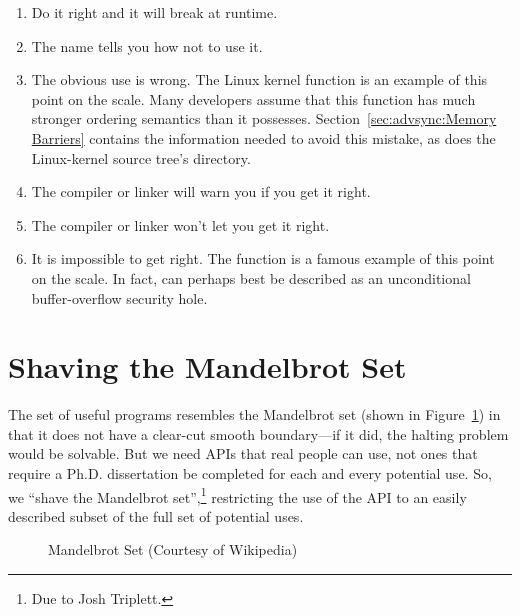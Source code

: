 \begin{enumerate}
\item	Do it right and it will break at runtime.
\item	The name tells you how not to use it.
\item	The obvious use is wrong.
	The Linux kernel  function is an example of
	this point on the scale.
	Many developers assume that this function has much
	stronger ordering semantics than it possesses.
	Section~\ref{sec:advsync:Memory Barriers} contains the
	information needed to avoid this mistake, as does the
	Linux-kernel source tree's  directory.
\item	The compiler or linker will warn you if you get it right.
\item	The compiler or linker won't let you get it right.
\item	It is impossible to get right.
	The  function is a famous example of this point on
	the scale.
	In fact,  can perhaps best be described as
	an unconditional buffer-overflow security hole.
\fi
\end{enumerate}

\section{Shaving the Mandelbrot Set}
\label{sec:easy:Shaving the Mandelbrot Set}

The set of useful programs resembles the Mandelbrot set
(shown in Figure~\ref{fig:easy:Mandelbrot Set})
in that it does
not have a clear-cut smooth boundary---if it did, the halting problem
would be solvable.
But we need APIs that real people can use, not ones that require a
Ph.D. dissertation be completed for each and every potential use.
So, we ``shave the Mandelbrot set'',\footnote{
	Due to Josh Triplett.}
restricting the use of the
API to an easily described subset of the full set of potential uses.

\begin{figure}[htb]
\centering
{}
\caption{Mandelbrot Set (Courtesy of Wikipedia)}
\label{fig:easy:Mandelbrot Set}
\end{figure}

